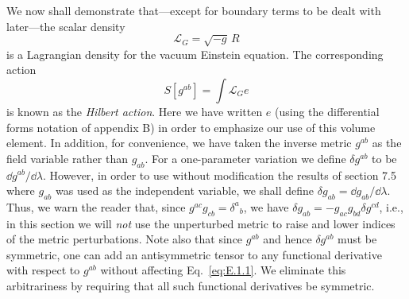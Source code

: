 We now shall demonstrate that---except for boundary terms to be dealt with
later---the scalar density
\begin{equation}
  \mathcal L_G=\sqrt{-g}\,R
  \tag{E.1.12}\label{eq:E.1.12}
\end{equation}
is a Lagrangian density for the vacuum Einstein equation. The corresponding action
\begin{equation}
  S[g^{ab}]=\int\mathcal L_G e
  \tag{E.1.13}\label{eq:E.1.13}
\end{equation}
is known as the \emph{Hilbert action}. Here we have written \(e\) (using the
differential forms notation of appendix B) in order to emphasize our use of this
volume element. In addition, for convenience, we have taken the inverse metric
\(g^{ab}\) as the field variable rather than \(g_{ab}\). For a one-parameter
variation we define \(\delta g^{ab}\) to be \(\dd g^{ab}/\dd\lambda\). However, in
order to use without modification the results of section 7.5 where \(g_{ab}\) was
used as the independent variable, we shall define
\(\delta g_{ab}=\dd g_{ab}/\dd\lambda\). Thus, we warn the reader that, since
\(g^{ac}g_{cb}=\delta^a{}_b\), we have
\(\delta g_{ab}=-g_{ac}g_{bd}\delta g^{cd}\), i.e., in this section we will
\emph{not} use the unperturbed metric to raise and lower indices of the metric
perturbations. Note also that since \(g^{ab}\) and hence \(\delta g^{ab}\) must be
symmetric, one can add an antisymmetric tensor to any functional derivative with
respect to \(g^{ab}\) without affecting Eq.~\eqref{eq:E.1.1}. We eliminate this
arbitrariness by requiring that all such functional derivatives be symmetric.

